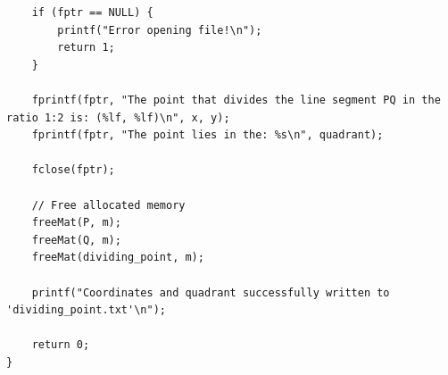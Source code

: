 \documentclass{beamer}
\theoremstyle{remark}
\numberwithin{equation}{section}
\begin{document}
    \begin{frame}[fragile]
    \lstset{style=Cstyle}
    \begin{lstlisting}
    if (fptr == NULL) {
        printf("Error opening file!\n");
        return 1;
    }

    fprintf(fptr, "The point that divides the line segment PQ in the ratio 1:2 is: (%lf, %lf)\n", x, y);
    fprintf(fptr, "The point lies in the: %s\n", quadrant);

    fclose(fptr);

    // Free allocated memory
    freeMat(P, m);
    freeMat(Q, m);
    freeMat(dividing_point, m);

    printf("Coordinates and quadrant successfully written to 'dividing_point.txt'\n");

    return 0;
}
\end{lstlisting}


\end{frame}
\end{document}
